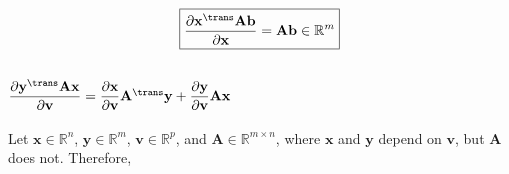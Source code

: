 \begin{align}
    \boxed{\dfrac{\partial \mathbf{x}^\trans \mathbf{A} \mathbf{b}}{\partial \mathbf{x}} = \mathbf{Ab} \in \mathbb{R}^{m}}
\end{align}


\subsection{\(\dfrac{\partial \mathbf{y}^\trans \mathbf{A} \mathbf{x}}{\partial \mathbf{v}} = \dfrac{\partial \mathbf{x}}{\partial \mathbf{v}} \mathbf{A}^{\trans} \mathbf{y} + \dfrac{\partial \mathbf{y}}{\partial \mathbf{v}} \mathbf{A} \mathbf{x}\)}
Let \(\mathbf{x} \in \mathbb{R}^{n}\), \(\mathbf{y} \in \mathbb{R}^{m}\), \(\mathbf{v} \in \mathbb{R}^{p}\), and \(\mathbf{A}\in \mathbb{R}^{m\times n}\), where \(\mathbf{x}\) and \(\mathbf{y}\) depend on \(\mathbf{v}\), but \(\mathbf{A}\) does not. Therefore,
